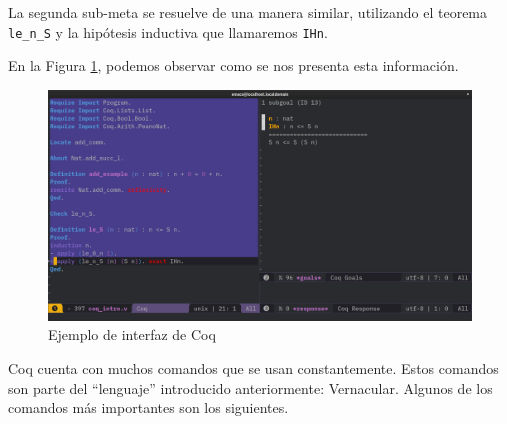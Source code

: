 La segunda sub-meta se resuelve de una manera similar, utilizando el teorema \lstinline{le_n_S} y la hipótesis inductiva que llamaremos \lstinline{IHn}.

En la Figura \ref{fig:ui}, podemos observar como se nos presenta esta información.

\begin{figure}[h]
  \centering
  \includegraphics[width=1\textwidth]{gfx/coq_emacs_example.png}
  \caption{Ejemplo de interfaz de Coq}
  \label{fig:ui}
\end{figure}

Coq cuenta con muchos comandos que se usan constantemente. Estos comandos son parte del ``lenguaje'' introducido anteriormente: Vernacular. Algunos de los comandos más importantes son los siguientes.

